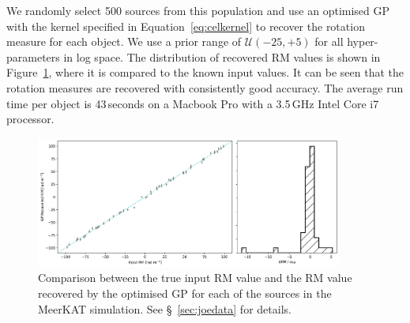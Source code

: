 \documentclass[fleqn,usenatbib]{mnras}
\begin{document}
%
%

We randomly select 500 sources from this population and use an optimised GP with the kernel specified in Equation~\ref{eq:celkernel} to recover the rotation measure for each object. We use a prior range of $\mathcal{U}(-25,+5)$ for all hyper-parameters in log space.  The distribution of recovered RM values is shown in Figure~\ref{fig:survey}, where it is compared to the known input values. It can be seen that the rotation measures are recovered with consistently good accuracy. The average run time per object is 43\,seconds on a Macbook Pro with a 3.5\,GHz Intel Core i7 processor.
%
\begin{figure}
\includegraphics[width=0.9\textwidth]{./FIGURES/figure9.png}
\caption{\label{fig:survey} Comparison between the true input RM value and the RM value recovered by the optimised GP for each of the sources in the MeerKAT simulation. See \S~\ref{sec:joedata} for details.}
\end{figure}
\end{document}
